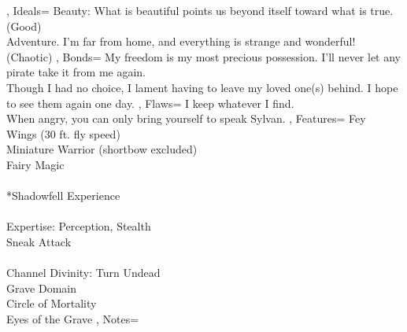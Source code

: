 \documentclass[10pt,a4paper]{scrbook}
\begin{document}
{{		},
		Ideals={
			\tiny
			Beauty: What is beautiful points us beyond itself toward what is true. (Good)\\
			Adventure. I'm far from home, and everything is strange and wonderful! (Chaotic)
		},
		Bonds={
			\tiny
			My freedom is my most precious possession. I’ll never let any pirate take it from me again.\\
			Though I had no choice, I lament having to leave my loved one(s) behind. I hope to see them again one day.
		},
		Flaws={
			\tiny
			I keep whatever I find.\\
			When angry, you can only bring yourself to speak Sylvan.
		},
		Features={
			Fey\\
			Wings (30 ft. fly speed) \\
			Miniature Warrior (shortbow excluded)\\
			Fairy Magic\\
			\\
			*Shadowfell Experience\\
			\\
			Expertise: Perception, Stealth\\
			Sneak Attack\\
			\\
			Channel Divinity:
			Turn Undead
			\\
			Grave Domain\\
			Circle of Mortality\\
			Eyes of the Grave
		},
		Notes={
			
		}
	}
\end{document}
